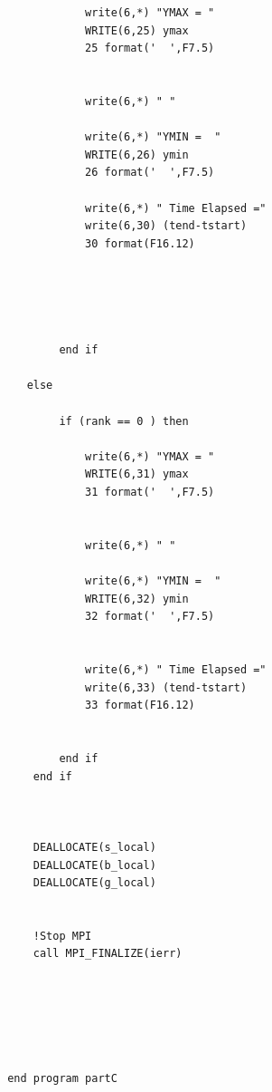 \documentclass[12pt]{article}
\begin{document}
\begin{lstlisting}
             write(6,*) "YMAX = "
             WRITE(6,25) ymax
             25 format('  ',F7.5)
 
 
             write(6,*) " " 
 
             write(6,*) "YMIN =  "
             WRITE(6,26) ymin
             26 format('  ',F7.5)
 
             write(6,*) " Time Elapsed ="
             write(6,30) (tend-tstart)
             30 format(F16.12)
 
 
 
                 
 
         end if
      
    else 
 
         if (rank == 0 ) then 
 
             write(6,*) "YMAX = "
             WRITE(6,31) ymax
             31 format('  ',F7.5)
 
 
             write(6,*) " " 
 
             write(6,*) "YMIN =  "
             WRITE(6,32) ymin
             32 format('  ',F7.5)
             
             
             write(6,*) " Time Elapsed ="
             write(6,33) (tend-tstart)
             33 format(F16.12)
 
 
         end if
     end if 
     
 
 
     DEALLOCATE(s_local)
     DEALLOCATE(b_local)
     DEALLOCATE(g_local)
 
 
     !Stop MPI
     call MPI_FINALIZE(ierr)
 
 
 
 
 
 
 end program partC
 
       
   \end{lstlisting}







    


    
    



    
\end{document}
